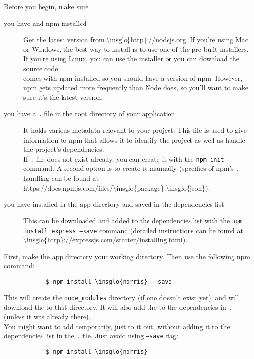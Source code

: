 		Before you begin, make sure
		\begin{description}
			\item[you have  and npm installed] Get the latest version from \url{\insglo{http}://nodejs.org}. If you're using Mac or Windows, the best way to install  is to use one of the pre-built installers. If you're using Linux, you can use the installer or you can download the source code.\\
			 comes with npm installed so you should have a version of npm. However, npm gets updated more frequently than Node does, so you'll want to make sure it's the latest version.
			\item[you have a \texttt{.} file in the root directory of your application] It holds various metadata relevant to your project. This file is used to give information to npm that allows it to identify the project as well as handle the project's dependencies.\\
			If \texttt{.} file does not exist already, you can create it with the \texttt{npm init} command. A second option is to create it manually (specifics of npm's \texttt{.} handling can be found at \url{https://docs.npmjs.com/files/\insglo{package}.\insglo{json}}).
			\item[you have  installed in the app directory and saved in the dependencies list] This  can be downloaded and added to the dependencies list with the \texttt{npm install express --save} command (detailed instructions can be found at \url{\insglo{http}://expressjs.com/starter/installing.html}).
		\end{description}
		First, make the app directory your working directory. Then use the following npm command:
		\begin{lstlisting}
			$ npm install \insglo{norris} --save
		\end{lstlisting}
		This will create the \texttt{node\_modules} directory (if one doesn't exist yet), and will download the  to that directory. It will also add the  to the dependencies in \texttt{.} (unless it was already there).\\
		You might want to add  temporarily, just to it out, without adding it to the dependencies list in the \texttt{.} file. Just avoid using \texttt{--save} flag:
		\begin{lstlisting}
			$ npm install \insglo{norris}
		\end{lstlisting}